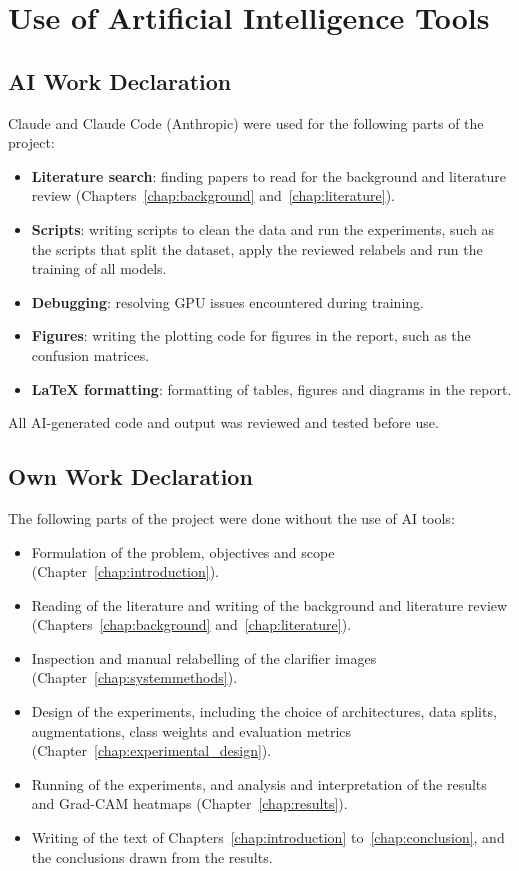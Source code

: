 \chapter{Use of Artificial Intelligence Tools}{}
\makeatletter{}\makeatother
\label{appen:ai_usage}

\section{AI Work Declaration}
Claude and Claude Code (Anthropic) were used for the following parts of the project:
\begin{itemize}
    \item \textbf{Literature search}: finding papers to read for the background and literature review (Chapters~\ref{chap:background} and~\ref{chap:literature}).
    \item \textbf{Scripts}: writing scripts to clean the data and run the experiments, such as the scripts that split the dataset, apply the reviewed relabels and run the training of all models.
    \item \textbf{Debugging}: resolving GPU issues encountered during training.
    \item \textbf{Figures}: writing the plotting code for figures in the report, such as the confusion matrices.
    \item \textbf{LaTeX formatting}: formatting of tables, figures and diagrams in the report.
\end{itemize}
All AI-generated code and output was reviewed and tested before use.

\section{Own Work Declaration}
The following parts of the project were done without the use of AI tools:
\begin{itemize}
    \item Formulation of the problem, objectives and scope (Chapter~\ref{chap:introduction}).
    \item Reading of the literature and writing of the background and literature review (Chapters~\ref{chap:background} and~\ref{chap:literature}).
    \item Inspection and manual relabelling of the clarifier images (Chapter~\ref{chap:systemmethods}).
    \item Design of the experiments, including the choice of architectures, data splits, augmentations, class weights and evaluation metrics (Chapter~\ref{chap:experimental_design}).
    \item Running of the experiments, and analysis and interpretation of the results and Grad-CAM heatmaps (Chapter~\ref{chap:results}).
    \item Writing of the text of Chapters~\ref{chap:introduction} to~\ref{chap:conclusion}, and the conclusions drawn from the results.
\end{itemize}
